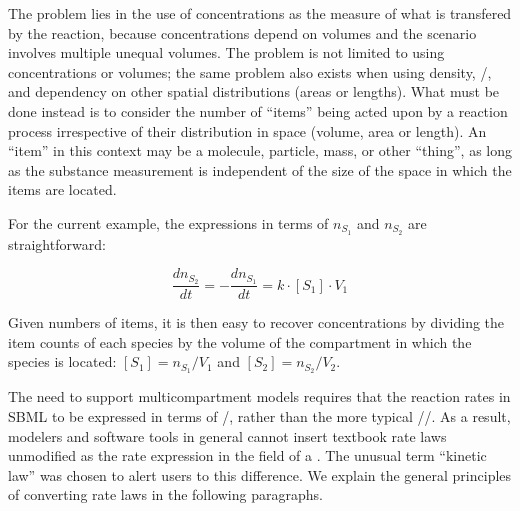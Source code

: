 The problem lies in the use of concentrations as the measure of
what is transfered by the reaction, because concentrations depend
on volumes and the scenario involves multiple unequal volumes.
The problem is not limited to using concentrations or volumes; the
same problem also exists when using density, \ie
{}/, and dependency on other spatial
distributions (\ie areas or lengths).  What must be done instead
is to consider the number of ``items'' being acted upon by a
reaction process irrespective of their distribution in space
(volume, area or length).  An ``item'' in this context may be a
molecule, particle, mass, or other ``thing'', as long as the
substance measurement is independent of the size of the space in
which the items are located.

For the current example, the expressions in terms of $n_{S_1}$ and
$n_{S_2}$ are straightforward:
\begin{linenomath}
\begin{equation*}
  \frac{dn_{S_2}}{dt} = -\frac{dn_{S_1}}{dt} = k \cdot [S_1] \cdot V_1
\end{equation*}
\end{linenomath}
Given numbers of items, it is then easy to recover concentrations
by dividing the item counts of each species by the volume of the
compartment in which the species is located: $[S_1] = n_{S_1}/V_1$
and $[S_2] = n_{S_2}/V_2$.

The need to support multicompartment models requires that the
reaction rates in SBML to be expressed in terms of
/, rather than the more typical
//.  As a
result, modelers and software tools in general cannot insert
textbook rate laws unmodified as the rate expression in the
 field of a \KineticLaw.  The unusual term ``kinetic
law'' was chosen to alert users to this difference.  We explain
the general principles of converting rate laws in the following
paragraphs.



